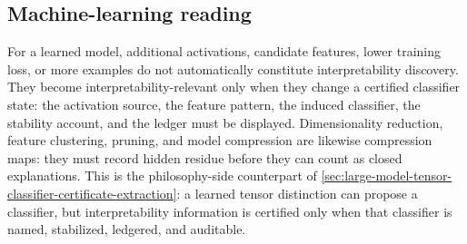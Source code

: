 \subsection{Machine-learning reading}
\label{subsec:philosophy-classifier-shift-ml-reading}

For a learned model, additional activations, candidate features, lower
training loss, or more examples do not automatically constitute
interpretability discovery. They become interpretability-relevant only
when they change a certified classifier state: the activation source, the
feature pattern, the induced classifier, the stability account, and the
ledger must be displayed. Dimensionality reduction, feature clustering,
pruning, and model compression are likewise compression maps: they must
record hidden residue before they can count as closed explanations. This
is the philosophy-side counterpart of
\autoref{sec:large-model-tensor-classifier-certificate-extraction}: a
learned tensor distinction can propose a classifier, but interpretability
information is certified only when that classifier is named, stabilized,
ledgered, and auditable.

